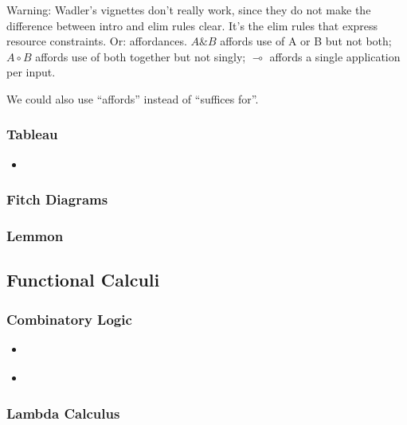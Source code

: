 \documentclass{article}
\begin{document}
Warning: Wadler's vignettes don't really work, since they do not make
the difference between intro and elim rules clear. It's the elim rules
that express resource constraints. Or: affordances. \(A\&B\) affords
use of A or B but not both; \(A\circ B\) affords use of both together
but not singly; \(\multimap\) affords a single application per input.

We could also use ``affords'' instead of ``suffices for''.

\subsubsection{Tableau}

\begin{itemize}

\item {} \cite{Smullyan1968-SMUFL}

\end{itemize}

\subsubsection{Fitch Diagrams}

 \cite{Fitch1952-FITSL}

\subsubsection{Lemmon}

 \cite{Lemmon1965-LEMBL}

\subsection{Functional Calculi}

\subsubsection{Combinatory Logic}

\begin{itemize}
\item {} \cite{bimbo2011combinatory}
\item {} \cite{Smullyan1985-SMUTMA-2}
\end{itemize}

\subsubsection{Lambda Calculus}
\end{document}
